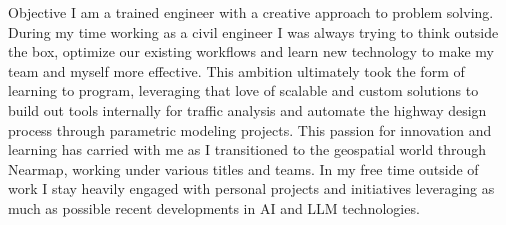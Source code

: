 \documentclass[]{mcdowellcv}
\begin{document}
	\makeheader
	
	\begin{cvsection}{Objective}
		I am a trained engineer with a creative approach to problem solving. During my time working as a civil engineer I was always trying to think outside the box, optimize our existing workflows and learn new technology to make my team and myself more effective. This ambition ultimately took the form of learning to program, leveraging that love of scalable and custom solutions to build out tools internally for traffic analysis and automate the highway design process through parametric modeling projects. This passion for innovation and learning has carried with me as I transitioned to the geospatial world through Nearmap, working under various titles and teams. In my free time outside of work I stay heavily engaged with personal projects and initiatives leveraging as much as possible recent developments in AI and LLM technologies.  
        
	\end{cvsection}
	
	
\end{document}
